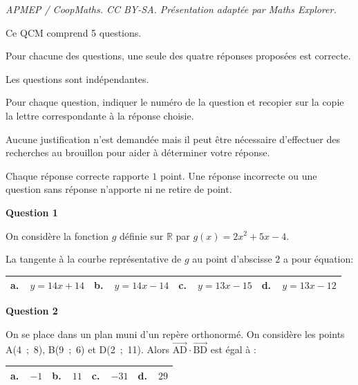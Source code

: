 \documentclass[10pt]{article}
\providecommand{\R}{\mathbb{R}}
\providecommand{\vect}[1]{\overrightarrow{#1}}
\begin{document}
\noindent\textit{APMEP / CoopMaths. CC BY-SA. Présentation adaptée par Maths Explorer.}\par\medskip
\medskip

Ce QCM comprend 5 questions.

Pour chacune des questions, une seule des quatre réponses proposées est correcte.

Les questions sont indépendantes.

Pour chaque question, indiquer le numéro de la question et recopier sur la copie la lettre correspondante à la réponse choisie.

Aucune justification n'est demandée mais il peut être nécessaire d'effectuer des recherches au brouillon pour aider à déterminer votre réponse.

Chaque réponse correcte rapporte $1$ point. Une réponse incorrecte ou une question sans réponse n'apporte ni ne retire de point.

\medskip

\textbf{Question 1}

\medskip

On considère la fonction $g$ définie sur $\R$ par $g(x) = 2x^2 + 5x - 4$.

La tangente à la courbe représentative de $g$ au point d'abscisse $2$ a pour équation:

\begin{center}
\begin{tabularx}{\linewidth}{|*{4}{X|}}\hline
\textbf{a.~~}$y = 14x + 14$ &\textbf{b.~~}$y = 14x -14$&\textbf{c.~~}$y = 13x - 15$&\textbf{d.~~}$y = 13x - 12$\\ \hline
\end{tabularx}
\end{center}

\medskip

\textbf{Question 2}

\medskip

On se place dans un plan muni d'un repère orthonormé. On considère les points A(4~;~8), 
B(9~;~6) et D(2~;~11). Alors $\vect{\text{AD}} \cdot \vect{\text{BD}}$ est égal à :

\begin{center}
\begin{tabularx}{\linewidth}{|*{4}{X|}}\hline
\textbf{a.~~}$-1$ &\textbf{b.~~}$11$&\textbf{c.~~}$-31$&\textbf{d.~~}$29$\\ \hline
\end{tabularx}
\end{center}
\end{document}
